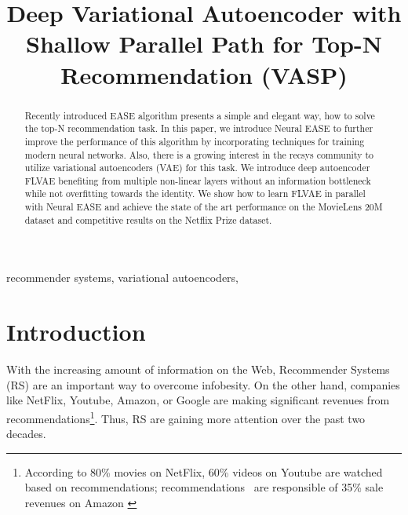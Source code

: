\documentclass[conference]{IEEEtran}
\begin{document}
\title{Deep Variational Autoencoder with Shallow Parallel Path for Top-N Recommendation (VASP)}

\author{
 \and
{}
}

\maketitle

\begin{abstract}
Recently introduced EASE algorithm presents a simple and elegant way, how to solve the top-N recommendation task. In this paper, we introduce Neural EASE to further improve the performance of this algorithm by incorporating techniques for training modern neural networks. Also, there is a growing interest in the recsys community to utilize variational autoencoders (VAE) for this task. We introduce deep autoencoder FLVAE benefiting from multiple non-linear layers without an information bottleneck while not overfitting towards the identity. We show how to learn FLVAE in parallel with Neural EASE and achieve the state of the art performance on the MovieLens 20M dataset and competitive results on the Netflix Prize dataset.
\end{abstract}

\begin{IEEEkeywords}
recommender systems, variational autoencoders, 
\end{IEEEkeywords}

\section{Introduction}
  
    With the increasing amount of information on the Web, Recommender Systems (RS) are an important way to overcome infobesity.  On the other hand, companies like NetFlix, Youtube, Amazon, or Google are making significant revenues from recommendations\footnote{According to \cite{Zhang2019a} 80\% movies on NetFlix, 60\% videos on Youtube are watched based on recommendations; recommendations \ are responsible of 35\% sale revenues on Amazon \cite{Symeonidis2016}}. Thus, RS are gaining more attention over the past two decades.
    
\end{document}
